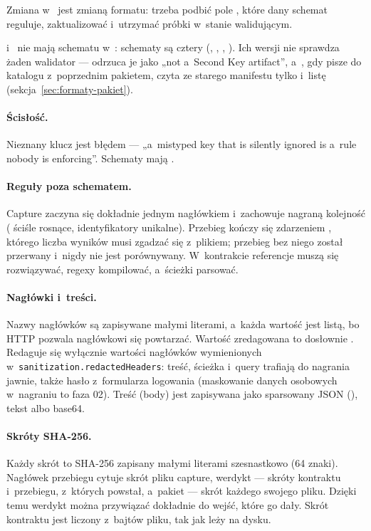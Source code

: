 Zmiana w~ jest zmianą formatu: trzeba podbić pole , które
dany schemat reguluje, zaktualizować  i~utrzymać próbki w~stanie
walidującym.

 i~ nie mają schematu w~:
schematy są cztery (, , ,
). Ich wersji nie sprawdza żaden walidator --- 
odrzuca je jako „not a~Second Key artifact”, a~, gdy pisze do katalogu
z~poprzednim pakietem, czyta ze starego manifestu tylko  i~listę
 (sekcja~\ref{sec:formaty-pakiet}).

\paragraph{Ścisłość.} Nieznany klucz jest błędem --- „a~mistyped key that is silently ignored
is a~rule nobody is enforcing”. Schematy mają .

\paragraph{Reguły poza schematem.} Capture zaczyna się dokładnie jednym nagłówkiem i~zachowuje nagraną kolejność ( ściśle rosnące, identyfikatory unikalne). Przebieg
kończy się zdarzeniem , którego liczba wyników musi zgadzać się z~plikiem;
przebieg bez niego został przerwany i~nigdy nie jest porównywany. W~kontrakcie referencje
muszą się rozwiązywać, regexy kompilować, a~ścieżki parsować.

\paragraph{Nagłówki i~treści.} Nazwy nagłówków są zapisywane małymi literami, a~każda wartość
jest listą, bo HTTP pozwala nagłówkowi się powtarzać. Wartość zredagowana to dosłownie
. Redaguje się wyłącznie wartości nagłówków wymienionych w~\texttt{sanitization.redactedHeaders}:
treść, ścieżka i~query trafiają do nagrania jawnie, także hasło z~formularza logowania (maskowanie danych
osobowych w~nagraniu to faza 02). Treść (body) jest zapisywana jako sparsowany JSON
(), tekst albo base64.

\paragraph{Skróty SHA-256.} Każdy skrót to SHA-256 zapisany małymi literami szesnastkowo
(64 znaki). Nagłówek przebiegu cytuje skrót pliku capture, werdykt --- skróty kontraktu i~przebiegu, z~których powstał, a~pakiet --- skrót każdego swojego pliku. Dzięki temu werdykt
można przywiązać dokładnie do wejść, które go dały. Skrót kontraktu jest liczony z~bajtów
pliku, tak jak leży na dysku.

